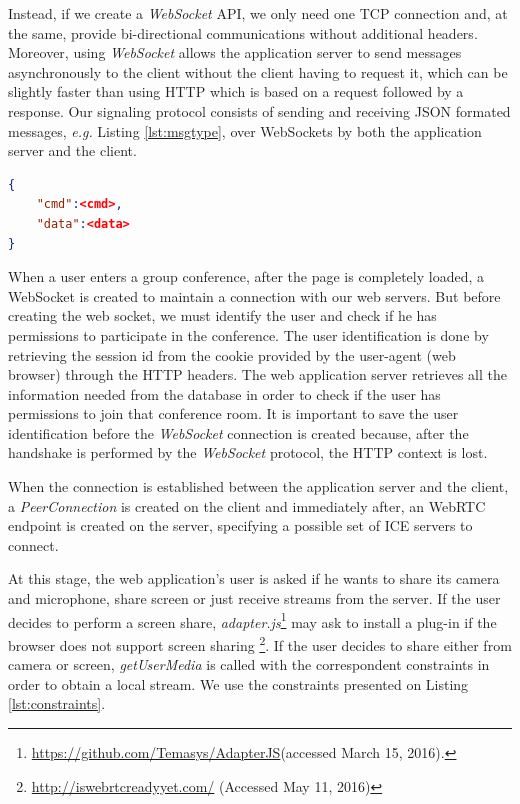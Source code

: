 Instead, if we create a \emph{WebSocket} \ac{API}, we only need one \ac{TCP} connection and, at the same, provide bi-directional communications without additional headers. Moreover, using \emph{WebSocket} allows the application server to send messages asynchronously to the client without the client having to request it, which can be slightly faster than using \ac{HTTP} which is based on a request followed by a response.
Our signaling protocol consists of sending and receiving \ac{JSON} formated messages, \emph{e.g.} Listing \ref{lst:msgtype}, over WebSockets by both the application server and the client. 

\begin{minipage}{\linewidth}
\begin{lstlisting}[caption={General structure of our WebSocket messages},label={lst:msgtype},language=json]
{
	"cmd":<cmd>,
	"data":<data>
}
\end{lstlisting}
\end{minipage}

When a user enters a group conference, after the page is completely loaded, a WebSocket is created to maintain a connection with our web servers. 
But before creating the web socket, we must identify the user and check if he has permissions to participate in the conference. The user identification is done by retrieving the session id from the cookie provided by the user-agent (web browser) through the \ac{HTTP} headers.
The web application server retrieves all the information needed from the database in order to check if the user has permissions to join that conference room. It is important to save the user identification before the \emph{WebSocket} connection is created because, after the handshake is performed by the \emph{WebSocket} protocol\cite{rfc6455}, the \ac{HTTP} context is lost.

When the connection is established between the application server and the client, a \emph{PeerConnection} is created on the client and immediately after, an \ac{WebRTC} endpoint is created on the server, specifying a possible set of \ac{ICE} servers to connect.

At this stage, the web application's user is asked if he wants to share its camera and microphone, share screen or just receive streams from the server. If the user decides to perform a screen share, \emph{adapter.js}\footnote{\url{https://github.com/Temasys/AdapterJS}(accessed March 15, 2016).} may ask to install a plug-in if the browser does not support screen sharing \footnote{\url{http://iswebrtcreadyyet.com/} (Accessed May 11, 2016)}.
If the user decides to share either from camera or screen, \emph{getUserMedia} is called with the correspondent constraints in order to obtain a local stream. We use the constraints presented on Listing \ref{lst:constraints}. 

